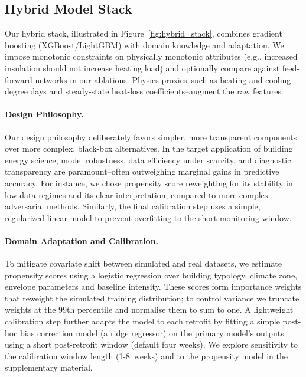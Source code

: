 ﻿\documentclass{article}
\begin{document}
\subsection{Hybrid Model Stack}
Our hybrid stack, illustrated in Figure~\ref{fig:hybrid_stack}, combines gradient boosting (XGBoost/LightGBM) with domain knowledge and adaptation. We impose monotonic constraints on physically monotonic attributes 
(e.g., increased insulation should not increase heating load) and optionally compare against feed-forward networks in our ablations. Physics proxies--such as heating and cooling degree days and steady-state heat-loss coefficients--augment the raw features.

\paragraph{Design Philosophy.} Our design philosophy deliberately favors simpler, more transparent components over more complex, black-box alternatives. In the target application of building energy science, model robustness, data efficiency under scarcity, and diagnostic transparency are paramount--often outweighing marginal gains in predictive accuracy. For instance, we chose propensity score reweighting for its stability in low-data regimes and its clear interpretation, compared to more complex adversarial methods. Similarly, the final calibration step uses a simple, regularized linear model to prevent overfitting to the short monitoring window.

\paragraph{Domain Adaptation and Calibration.} To mitigate covariate shift between simulated and real datasets, we estimate propensity scores using a logistic regression over building typology, climate zone, envelope parameters and baseline intensity.
These scores form importance weights that reweight the simulated training distribution;
to control variance we truncate weights at the 99th percentile and normalise them to sum to one.
A lightweight calibration step further adapts the model to each retrofit by fitting a simple post-hoc bias correction model (a ridge regressor) on the primary model's outputs using a short post-retrofit window (default four weeks).
We explore sensitivity to the calibration window length (1-8~weeks) and to the propensity model in the supplementary material.
\end{document}
